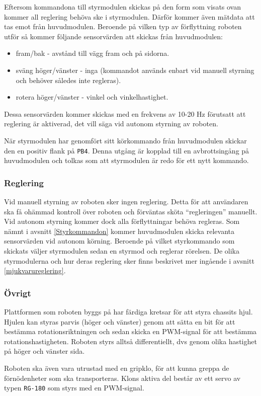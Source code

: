 \documentclass[11pt]{article}
\begin{document}
\begin{flushleft}
Eftersom kommandona till styrmodulen skickas på den form som visats ovan kommer all reglering behöva ske i styrmodulen. Därför kommer även mätdata att tas emot från huvudmodulen. Beroende på vilken typ av förflyttning roboten utför så kommer följande sensorvärden att skickas från huvudmodulen:
\begin{itemize}
	\item fram/bak - avstånd till vägg fram och på sidorna.
	\item sväng höger/vänster - inga (kommandot används enbart vid manuell styrning och behöver således inte regleras).
	\item rotera höger/vänster - vinkel och vinkelhastighet.
\end{itemize}
Dessa sensorvärden kommer skickas med en frekvens av 10-20 Hz förutsatt att reglering är aktiverad, det vill säga vid autonom styrning av roboten.

När styrmodulen har genomfört sitt körkommando från huvudmodulen skickar den en positiv flank på \verb+PB4+. Denna utgång är kopplad till en avbrottsingång på huvudmodulen och tolkas som att styrmodulen är redo för ett nytt kommando. 

\subsubsection{Reglering}
Vid manuell styrning av roboten sker ingen reglering. Detta för att användaren ska få ohämmad kontroll över roboten och förväntas sköta ``regleringen'' manuellt. Vid autonom styrning kommer dock alla förflyttningar behöva regleras. Som nämnt i avsnitt \ref{Styrkommandon} kommer huvudmodulen skicka relevanta sensorvärden vid autonom körning. Beroende på vilket styrkommando som skickats väljer styrmodulen sedan en styrmod och reglerar rörelsen. De olika styrmodulerna och hur deras reglering sker finns beskrivet mer ingående i avsnitt \ref{mjukvarureglering}.

\subsubsection{Övrigt}
Plattformen som roboten byggs på har färdiga kretsar för att styra chassits hjul. Hjulen kan styras parvis (höger och vänster) genom att sätta en bit för att bestämma rotationsriktningen och sedan skicka en PWM-signal för att bestämma rotationshastigheten. Roboten styrs alltså differentiellt, dvs genom olika hastighet på höger och vänster sida.

Roboten ska även vara utrustad med en gripklo, för att kunna greppa de förnödenheter som ska transporteras. Klons aktiva del består av ett servo av typen \verb+RG-180+ som styrs med en PWM-signal.


\end{flushleft}
\end{document}
